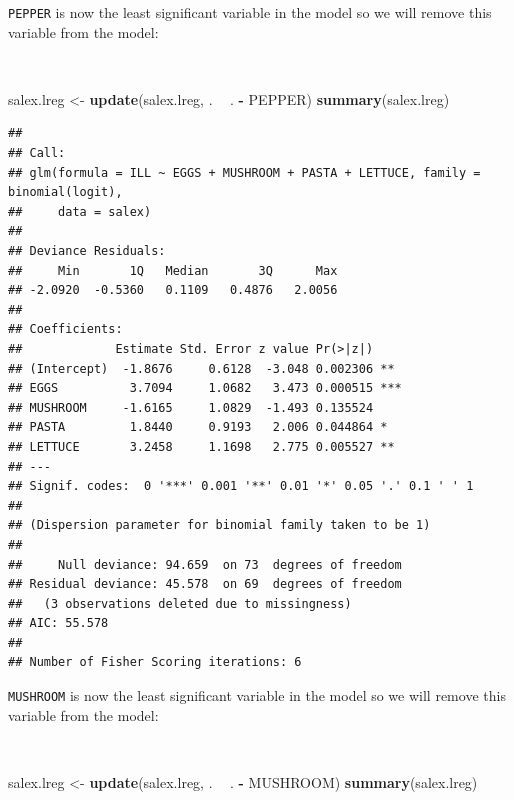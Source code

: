 \documentclass[12pt,a4paper]{book}
\newenvironment{Shaded}{\begin{snugshade}}{\end{snugshade}}
\newcommand{\KeywordTok}[1]{\textcolor[rgb]{0.13,0.29,0.53}{\textbf{#1}}}
\newcommand{\StringTok}[1]{\textcolor[rgb]{0.31,0.60,0.02}{#1}}
\newcommand{\OperatorTok}[1]{\textcolor[rgb]{0.81,0.36,0.00}{\textbf{#1}}}
\newcommand{\NormalTok}[1]{#1}
\theoremstyle{definition}
\theoremstyle{definition}
\theoremstyle{definition}
\theoremstyle{remark}
\begin{document}
\newpage

\texttt{PEPPER} is now the least significant variable in the model so we
will remove this variable from the model:

~

\begin{Shaded}
\begin{Highlighting}[]
\NormalTok{salex.lreg <-}\StringTok{ }\KeywordTok{update}\NormalTok{(salex.lreg, . }\OperatorTok{~}\StringTok{ }\NormalTok{. }\OperatorTok{-}\StringTok{ }\NormalTok{PEPPER)}
\KeywordTok{summary}\NormalTok{(salex.lreg)}
\end{Highlighting}
\end{Shaded}

\begin{verbatim}
## 
## Call:
## glm(formula = ILL ~ EGGS + MUSHROOM + PASTA + LETTUCE, family = binomial(logit), 
##     data = salex)
## 
## Deviance Residuals: 
##     Min       1Q   Median       3Q      Max  
## -2.0920  -0.5360   0.1109   0.4876   2.0056  
## 
## Coefficients:
##             Estimate Std. Error z value Pr(>|z|)    
## (Intercept)  -1.8676     0.6128  -3.048 0.002306 ** 
## EGGS          3.7094     1.0682   3.473 0.000515 ***
## MUSHROOM     -1.6165     1.0829  -1.493 0.135524    
## PASTA         1.8440     0.9193   2.006 0.044864 *  
## LETTUCE       3.2458     1.1698   2.775 0.005527 ** 
## ---
## Signif. codes:  0 '***' 0.001 '**' 0.01 '*' 0.05 '.' 0.1 ' ' 1
## 
## (Dispersion parameter for binomial family taken to be 1)
## 
##     Null deviance: 94.659  on 73  degrees of freedom
## Residual deviance: 45.578  on 69  degrees of freedom
##   (3 observations deleted due to missingness)
## AIC: 55.578
## 
## Number of Fisher Scoring iterations: 6
\end{verbatim}

\newpage

\texttt{MUSHROOM} is now the least significant variable in the model so
we will remove this variable from the model:

~

\begin{Shaded}
\begin{Highlighting}[]
\NormalTok{salex.lreg <-}\StringTok{ }\KeywordTok{update}\NormalTok{(salex.lreg, . }\OperatorTok{~}\StringTok{ }\NormalTok{. }\OperatorTok{-}\StringTok{ }\NormalTok{MUSHROOM)}
\KeywordTok{summary}\NormalTok{(salex.lreg)}
\end{Highlighting}
\end{Shaded}
\end{document}
